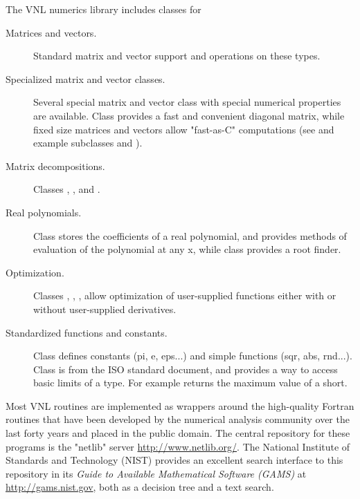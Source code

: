 The VNL numerics library includes classes for
\begin{description}
        \item[Matrices and vectors.] Standard matrix and vector support
        and operations on these types.

        \item[Specialized matrix and vector classes.] Several special matrix
        and vector class with special numerical properties are
        available. Class  provides a fast and
        convenient diagonal matrix, while fixed size matrices and vectors
        allow "fast-as-C" computations (see  
        and example subclasses  and 
        ).

        \item[Matrix decompositions.] Classes , 
        , and 
        . 

        \item[Real polynomials.] Class  stores 
        the coefficients of a real polynomial, and provides methods of 
        evaluation of the polynomial at any x, while class 
         provides a root finder. 

        \item[Optimization.] Classes ,
        , ,
         allow optimization of user-supplied
        functions either with or without user-supplied derivatives.

        \item[Standardized functions and constants.] Class 
        defines constants (pi, e, eps...) and simple functions (sqr, abs,
        rnd...). Class  is from the ISO standard
        document, and provides a way to access basic limits of a
        type. For example  returns the maximum
        value of a short.
\end{description}

Most VNL routines are implemented as wrappers around the high-quality Fortran
routines that have been developed by the numerical analysis community over
the last forty years and placed in the public domain. The central repository
for these programs is the "netlib" server \url{http://www.netlib.org/}. The
National Institute of Standards and Technology (NIST) provides an excellent
search interface to this repository in its \emph{Guide to Available Mathematical
Software (GAMS)} at \url{http://gams.nist.gov}, both as a decision tree and a
text search.

